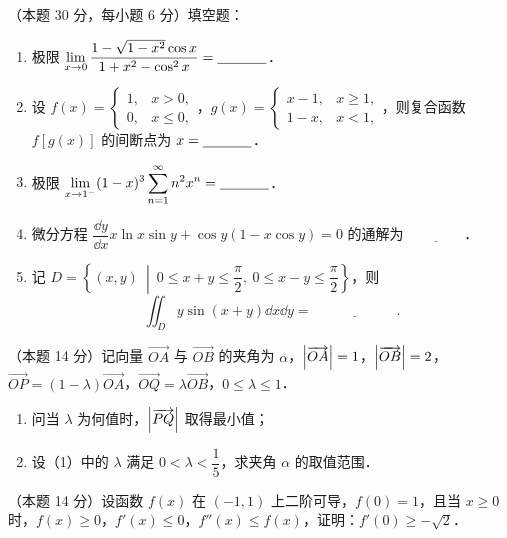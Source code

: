 
\begin{problems}
\item[一、]（本题 30 分，每小题 6 分）填空题：
\begin{enumerate}
  \item 极限 $\displaystyle \lim_{x\to0}\frac{1-\sqrt{1-x^2}\cos x}{1+x^2-\cos^2x}=\underline{\hspace{3.5em}}$．
  \item 设 $f(x)=\begin{cases}1,&x>0,\\0,&x\le0,\end{cases}$，$g(x)=\begin{cases}x-1,&x\ge1,\\1-x,&x<1,\end{cases}$，则复合函数 $f[g(x)]$ 的间断点为 $x=\underline{\hspace{3.5em}}$．
  \item 极限 $\displaystyle \lim_{x\to1^-}(1-x)^3\sum_{n=1}^{\infty}n^2x^n=\underline{\hspace{3.5em}}$．
  \item 微分方程 $\dfrac{\dd y}{\dd x}x\ln x\sin y+\cos y(1-x\cos y)=0$ 的通解为 $\underline{\hspace{4em}}$．
  \item 记 $D=\left\{(x,y)\ \middle|\ 0\le x+y\le\dfrac{\pi}{2},\ 0\le x-y\le\dfrac{\pi}{2}\right\}$，则
  \[
    \iint_D y\sin(x+y)\dd x\dd y=\underline{\hspace{6em}}.
  \]
\end{enumerate}

\item[二、]（本题 14 分）记向量 $\overrightarrow{OA}$ 与 $\overrightarrow{OB}$ 的夹角为 $\alpha$，$\left|\overrightarrow{OA}\right|=1$，$\left|\overrightarrow{OB}\right|=2$，$\overrightarrow{OP}=(1-\lambda)\overrightarrow{OA}$，$\overrightarrow{OQ}=\lambda\overrightarrow{OB}$，$0\le\lambda\le1$．
\begin{enumerate}
  \item 问当 $\lambda$ 为何值时，$\left|\overrightarrow{PQ}\right|$ 取得最小值；
  \item 设（1）中的 $\lambda$ 满足 $0<\lambda<\dfrac15$，求夹角 $\alpha$ 的取值范围．
\end{enumerate}

\item[三、]（本题 14 分）设函数 $f(x)$ 在 $(-1,1)$ 上二阶可导，$f(0)=1$，且当 $x\ge0$ 时，$f(x)\ge0$，$f'(x)\le0$，$f''(x)\le f(x)$，证明：$f'(0)\ge-\sqrt2$．


\end{problems}
